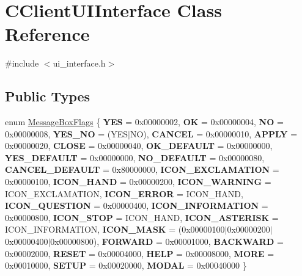 \hypertarget{class_c_client_u_i_interface}{}\section{C\+Client\+U\+I\+Interface Class Reference}
\label{class_c_client_u_i_interface}


{\ttfamily \#include $<$ui\+\_\+interface.\+h$>$}

\subsection*{Public Types}
\begin{DoxyCompactItemize}
\item 
enum \mbox{\hyperlink{class_c_client_u_i_interface_a568cf07ecac3fac224d63b42a32e8bc1}{Message\+Box\+Flags}} \{ \newline
{\bfseries Y\+ES} = 0x00000002, 
{\bfseries OK} = 0x00000004, 
{\bfseries NO} = 0x00000008, 
{\bfseries Y\+E\+S\+\_\+\+NO} = (Y\+E\+S$\vert$\+NO), 
\newline
{\bfseries C\+A\+N\+C\+EL} = 0x00000010, 
{\bfseries A\+P\+P\+LY} = 0x00000020, 
{\bfseries C\+L\+O\+SE} = 0x00000040, 
{\bfseries O\+K\+\_\+\+D\+E\+F\+A\+U\+LT} = 0x00000000, 
\newline
{\bfseries Y\+E\+S\+\_\+\+D\+E\+F\+A\+U\+LT} = 0x00000000, 
{\bfseries N\+O\+\_\+\+D\+E\+F\+A\+U\+LT} = 0x00000080, 
{\bfseries C\+A\+N\+C\+E\+L\+\_\+\+D\+E\+F\+A\+U\+LT} = 0x80000000, 
{\bfseries I\+C\+O\+N\+\_\+\+E\+X\+C\+L\+A\+M\+A\+T\+I\+ON} = 0x00000100, 
\newline
{\bfseries I\+C\+O\+N\+\_\+\+H\+A\+ND} = 0x00000200, 
{\bfseries I\+C\+O\+N\+\_\+\+W\+A\+R\+N\+I\+NG} = I\+C\+O\+N\+\_\+\+E\+X\+C\+L\+A\+M\+A\+T\+I\+ON, 
{\bfseries I\+C\+O\+N\+\_\+\+E\+R\+R\+OR} = I\+C\+O\+N\+\_\+\+H\+A\+ND, 
{\bfseries I\+C\+O\+N\+\_\+\+Q\+U\+E\+S\+T\+I\+ON} = 0x00000400, 
\newline
{\bfseries I\+C\+O\+N\+\_\+\+I\+N\+F\+O\+R\+M\+A\+T\+I\+ON} = 0x00000800, 
{\bfseries I\+C\+O\+N\+\_\+\+S\+T\+OP} = I\+C\+O\+N\+\_\+\+H\+A\+ND, 
{\bfseries I\+C\+O\+N\+\_\+\+A\+S\+T\+E\+R\+I\+SK} = I\+C\+O\+N\+\_\+\+I\+N\+F\+O\+R\+M\+A\+T\+I\+ON, 
{\bfseries I\+C\+O\+N\+\_\+\+M\+A\+SK} = (0x00000100$\vert$0x00000200$\vert$0x00000400$\vert$0x00000800), 
\newline
{\bfseries F\+O\+R\+W\+A\+RD} = 0x00001000, 
{\bfseries B\+A\+C\+K\+W\+A\+RD} = 0x00002000, 
{\bfseries R\+E\+S\+ET} = 0x00004000, 
{\bfseries H\+E\+LP} = 0x00008000, 
\newline
{\bfseries M\+O\+RE} = 0x00010000, 
{\bfseries S\+E\+T\+UP} = 0x00020000, 
{\bfseries M\+O\+D\+AL} = 0x00040000
 \}
\end{DoxyCompactItemize}
